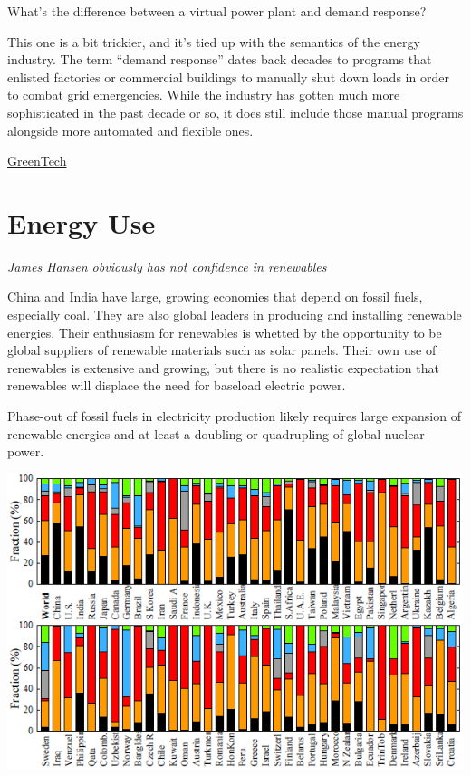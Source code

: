 \documentclass[
]{book}
\begin{document}
What's the difference between a virtual power plant and demand response?

This one is a bit trickier, and it's tied up with the semantics of the energy industry. The term ``demand response'' dates back decades to programs that enlisted factories or commercial buildings to manually shut down loads in order to combat grid emergencies. While the industry has gotten much more sophisticated in the past decade or so, it does still include those manual programs alongside more automated and flexible ones.

\href{https://www.greentechmedia.com/articles/read/so-what-exactly-are-virtual-power-plants}{GreenTech}

\hypertarget{energy-use}{%
\chapter{Energy Use}\label{energy-use}}

\emph{James Hansen obviously has not confidence in renewables}

China and India have large, growing economies that depend on fossil fuels, especially coal.
They are also global leaders in producing and installing renewable energies. Their enthusiasm
for renewables is whetted by the opportunity to be global suppliers of renewable materials such
as solar panels. Their own use of renewables is extensive and growing, but there is no realistic
expectation that renewables will displace the need for baseload electric power.

Phase-out of fossil fuels in electricity production likely requires large expansion of renewable
energies and at least a doubling or quadrupling of global nuclear power.

\includegraphics{fig/Energy_Consumption_by_Fuel_2019_World_and_71_Countries_James_Hansen_PlanetCh47.png}
\end{document}
